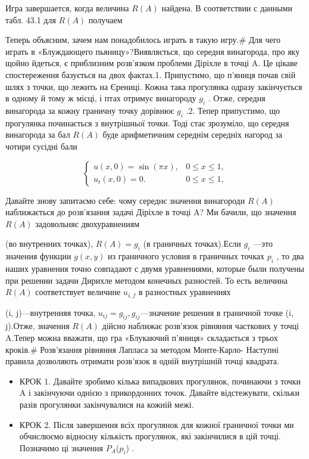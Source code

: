 \documentclass[
  ukrainian,
]{article}
\begin{document}
Игра завершается, когда величина \(R\left(A\right)\) найдена. В
соответствии с данными табл. 43.1 для \(R\left(A\right)\) получаем

Теперь объясним, зачем нам понадобилось играть в такую игру.\# Для чего
играть в «Блуждающего пьяницу»?Виявляється, що середня винагорода, про
яку щойно йдеться, є приблизним розв'язком проблеми Діріхле в точці A.
Це цікаве спостереження базується на двох фактах.1. Припустимо, що
п'яниця почав свій шлях з точки, що лежить на Єрениці. Кожна така
прогулянка одразу закінчується в одному й тому ж місці, і птах отримує
винагороду \(g_i\) . Отже, середня винагорода за кожну граничну точку
дорівнює \(g_i\) .2. Тепер припустимо, що прогулянка починається з
внутрішньої точки. Тоді стає зрозуміло, що середня винагорода за бал
\(R(A)\) буде арифметичним середнім середніх нагород за чотири сусідні
бали

\[
\begin{cases} u(x, 0) = \sin(\pi x), & 0 \le x \le 1, \\ u_t(x, 0) = 0. & 0 \le x \le 1, \end{cases}
\]

Давайте знову запитаємо себе: чому середнє значення винагороди \(R(A)\)
наближається до розв'язання задачі Діріхле в точці A? Ми бачили, що
значення \(R(A)\) задовольняє двохуравнениям

(во внутренних точках), \(R(A) = g_i\) (в граничных точках).Если \(g_i\)
---это значения функции \(g(x, y)\) из граничного условия в граничных
точках \(p_i\) , то два наших уравнения точно совпадают с двумя
уравнениями, которые были получены при решении задачи Дирихле методом
конечных разностей. То есть величина \(R(A)\) соответствует величине
\(u_{i,f}\) в разностных уравнениях

(i, j)---внутренняя точка, \(u_{ij} = g_{ij}, g_{ij}\)---значение
решения в граничной точке (i, j).Отже, значення \(R(A)\) дійсно наближає
розв'язок рівняння часткових у точці A.Тепер можна вважати, що гра
«Блукаючий п'яниця» складається з трьох кроків.\# Розв'язання рівняння
Лапласа за методом Монте-Карло- Наступні правила дозволяють отримати
розв'язок в одній внутрішній точці квадрата.

\begin{itemize}
\item
  КРОК 1. Давайте зробимо кілька випадкових прогулянок, починаючи з
  точки A і закінчуючи однією з прикордонних точок. Давайте
  відстежувати, скільки разів прогулянки закінчувалися на кожній межі.
\item
  КРОК 2. Після завершення всіх прогулянок для кожної граничної точки ми
  обчислюємо відносну кількість прогулянок, які закінчилися в цій точці.
  Позначимо ці значення \(P_A\)(\(p_i\)) .
\end{itemize}
\end{document}
